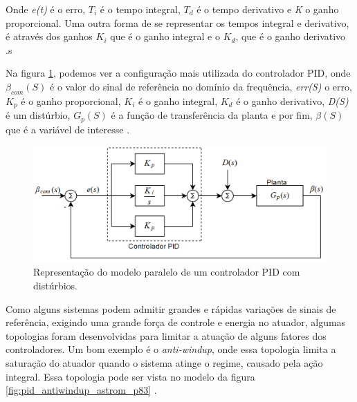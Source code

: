 Onde \textit{e(t)} é o erro, \textit{$T_i$} é o tempo integral, \textit{$T_d$} é o tempo derivativo e \textit{K} o ganho proporcional. Uma outra forma de se representar os tempos integral e derivativo, é através dos ganhos \textit{$K_i$} que é o ganho integral e o \textit{$K_d$}, que é o ganho derivativo \cite{Astrom1995}.s

Na figura \ref{fig:pid_controller_Snider_p35}, podemos ver a configuração mais utilizada do controlador PID, onde $\beta_{com}(S)$ é o valor do sinal de referência no domínio da frequência, \textit{err(S)} o erro, \textit{$K_p$} é o ganho proporcional, \textit{$K_i$} é o ganho integral, \textit{$K_d$} é o ganho derivativo, \textit{D(S)} é um distúrbio, \textit{$G_p(S)$} é a função de transferência da planta e por fim, \textit{$\beta(S)$} que é a variável de interesse \cite{Snider}.

\begin{figure}[H]
  \caption{Representação do modelo paralelo de um controlador PID com distúrbios.}
  \begin{center}
      \includegraphics[scale=0.55]{referencial/img/pid_controller_Snider_p35}
  \end{center}
  \label{fig:pid_controller_Snider_p35}
\end{figure}

Como alguns sistemas podem admitir grandes e rápidas variações de sinais de referência, exigindo uma grande força de controle e energia no atuador, algumas topologias foram desenvolvidas para limitar a atuação de alguns fatores dos controladores. Um bom exemplo é o \textit{anti-windup}, onde essa topologia limita a saturação do atuador quando o sistema atinge o regime, causado pela ação integral. Essa topologia pode ser vista no modelo da figura \ref{fig:pid_antiwindup_astrom_p83} \cite{Astrom1995}.

